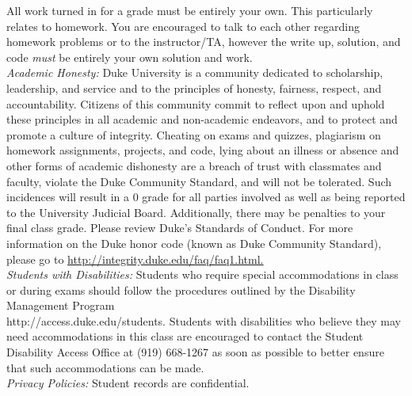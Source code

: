 \documentclass[11pt]{article}
\begin{document}
 All work turned in for a grade must be entirely your own. This particularly relates to homework. You are encouraged to talk to each other regarding homework problems or to the instructor/TA, however the write up, solution, and code \emph{must} be entirely your own solution and work. \\


\emph{Academic Honesty:} Duke University is a community dedicated to scholarship, leadership, and service and to the principles of honesty, fairness, respect, and accountability. Citizens of this community commit to reflect upon and uphold these principles in all academic and non-academic endeavors, and to protect and promote a culture of integrity. Cheating on exams and quizzes, plagiarism on homework assignments, projects, and code, lying about an illness or absence and other forms of academic dishonesty are a breach of trust with classmates and faculty, violate the Duke Community Standard, and will not be tolerated. Such incidences will result in a 0 grade for all parties involved as well as being reported to the University Judicial Board. Additionally, there may be penalties to your final class grade. Please review Duke's Standards of Conduct.
For more information on the Duke honor code (known as Duke Community Standard), please go to \url{http://integrity.duke.edu/faq/faq1.html.}\\




\emph{Students with Disabilities:} Students who require special accommodations in class or during exams should follow the procedures outlined by the Disability Management Program \\ http://access.duke.edu/students. Students with disabilities who believe they may need accommodations in this class are encouraged to contact the Student Disability Access Office at (919) 668-1267 as soon as possible to better ensure that such accommodations can be made. \\

\emph{Privacy Policies:} 
Student records are confidential. 
\end{document}
